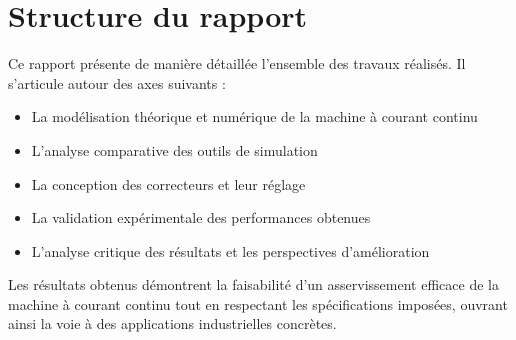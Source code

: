 \section{Structure du rapport}

Ce rapport présente de manière détaillée l'ensemble des travaux réalisés. Il s'articule autour des axes suivants :
\begin{itemize}
    \item La modélisation théorique et numérique de la machine à courant continu
    \item L'analyse comparative des outils de simulation
    \item La conception des correcteurs et leur réglage
    \item La validation expérimentale des performances obtenues
    \item L'analyse critique des résultats et les perspectives d'amélioration
\end{itemize}

Les résultats obtenus démontrent la faisabilité d'un asservissement efficace de la machine à courant continu tout en respectant les spécifications imposées, ouvrant ainsi la voie à des applications industrielles concrètes.


